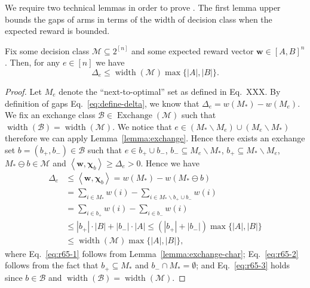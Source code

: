 \documentclass{article}
\newcommand{\M}{\mathcal M}
\newcommand{\B}{\mathcal B}
\newcommand{\del}{\backslash}
\DeclareMathOperator{\rank}{width}
\DeclareMathOperator{\Exchange}{Exchange}
\newcommand{\inn}[1]{\left\langle #1 \right\rangle}
\renewcommand{\vec}[1]{\boldsymbol{#1}}
\begin{document}
{We require two technical lemmas in order to prove .
The first lemma upper bounds the gaps of arms in terms of the width of decision class when the expected reward is bounded.
\begin{lemma}
\label{lemma:lower-bound-bound-gap}
Fix some decision class $\M\subseteq 2^{[n]}$ and some expected reward vector $\vec w \in [A,B]^n$.
Then, for any $e\in [n]$ we have
$$
\Delta_e \le \rank(\M) \max\{|A|,|B|\}.
$$
\end{lemma}
\begin{proof}
Let $M_e$ denote the ``next-to-optimal'' set as defined in Eq.~XXX.
By definition of gaps Eq.~\eqref{eq:define-delta}, we know that $\Delta_e = w(M_*)-w(M_e)$.
We fix an exchange class $\B\in \Exchange(\M)$ such that $\rank(\B)=\rank(\M)$.
We notice that $e\in (M_* \del M_e) \cup (M_e \del M_*)$ therefore we can apply Lemma~\ref{lemma:exchange}.
Hence there exists an exchange set $b=(b_+,b_-)\in \B$ such that 
$e \in b_+ \cup b_-$, $b_-\subseteq M_e\del M_*$, $b_+\subseteq M_*\del M_e$, $M_* \ominus b \in \M$ and $\inn{\vec w,\vec\chi_b}\ge \Delta_e > 0$.
Hence we have
\begin{align}
	\Delta_e &\le \inn{\vec w, \vec \chi_b} = w(M_*) - w(M_*\ominus b) \label{eq:r65-1}\\
					 &= \sum_{i\in M_*} w(i) - \sum_{i\in M_* \del b_+ \cup b_-} w(i) \nonumber\\
					 &= \sum_{i \in b_+} w(i) - \sum_{i\in b_-} w(i) \label{eq:r65-2}\\
					 &\le |b_+| \cdot |B| + |b_-| \cdot |A| \le (|b_+|+|b_-|) \max\{|A|,|B|\} \nonumber\\
					 &\le \rank(\M)\max\{|A|,|B|\},\label{eq:r65-3}
\end{align}
where Eq.~\eqref{eq:r65-1} follows from Lemma~\ref{lemma:exchange-char};
Eq.~\eqref{eq:r65-2} follows from  the fact that $b_+\subseteq M_*$ and $b_-\cap M_* = \emptyset$;
and Eq.~\eqref{eq:r65-3} holds since $b\in \B$ and $\rank(\B)=\rank(\M)$.
\end{proof}



}
\end{document}
